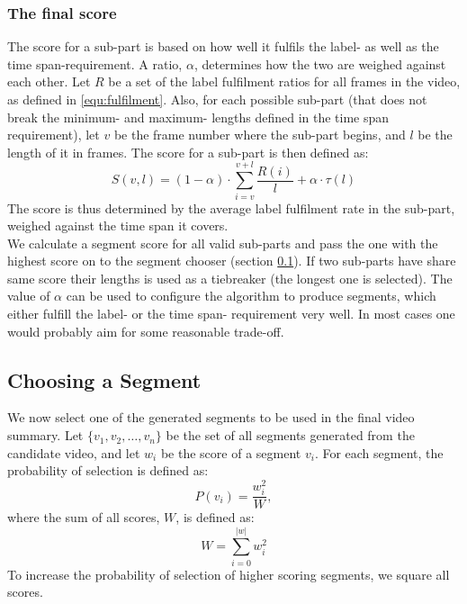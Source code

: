 \subsubsection{The final score}
%
The score for a sub-part is based on how well it fulfils the label- as well as the time span-requirement. A ratio, $\alpha$, determines how the two are weighed against each other. Let $R$ be a set of the label fulfilment ratios for all frames in the video, as defined in \ref{equ:fulfilment}. Also, for each possible sub-part (that does not break the minimum- and maximum- lengths defined in the time span requirement), let $v$ be the frame number where the sub-part begins, and $l$ be the length of it in frames. The score for a sub-part is then defined as:\\
%
\begin{equation}
S(v,l) =(1-\alpha) \cdot \sum_{i=v}^{v+l} \frac{R(i)}{l} + \alpha \cdot \tau(l)
\end{equation}\label{equ:segment_score}
%
The score is thus determined by the average label fulfilment rate in the sub-part, weighed against the time span it covers.\\
We calculate a segment score for all valid sub-parts and pass the one with the highest score on to the segment chooser (section \ref{sec:choosing_segment}). If two sub-parts have share same score their lengths is used as a tiebreaker (the longest one is selected). The value of $\alpha$ can be used to configure the algorithm to produce segments, which either fulfill the label- or the time span- requirement very well. In most cases one would probably aim for some reasonable trade-off.
%
%
\subsection{Choosing a Segment}\label{sec:choosing_segment}
%
We now select one of the generated segments to be used in the final video summary. Let $\{v_1,v_2,\dots,v_n\}$ be the set of all segments generated from the candidate video, and let $w_i$ be the score of a segment $v_i$. For each segment, the probability of selection is defined as:
%
\[
P(v_i) = \frac{w_i^2}{W},
\]
%
where the sum of all scores, $W$, is defined as:
%
\[
W = \sum_{i=0}^{|w|} w_i^2
\]
%
To increase the probability of selection of higher scoring segments, we square all scores.
%